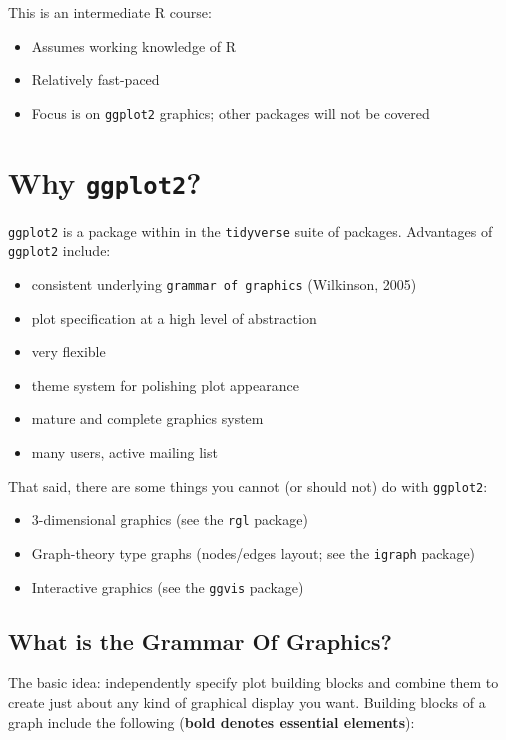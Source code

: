\documentclass[]{book}
\providecommand{\tightlist}{%
  \setlength{\itemsep}{0pt}\setlength{\parskip}{0pt}}
\begin{document}
This is an intermediate R course:

\begin{itemize}
\tightlist
\item
  Assumes working knowledge of R
\item
  Relatively fast-paced
\item
  Focus is on \texttt{ggplot2} graphics; other packages will not be
  covered
\end{itemize}

\section{\texorpdfstring{Why
\texttt{ggplot2}?}{Why ggplot2?}}\label{why-ggplot2}

\texttt{ggplot2} is a package within in the \texttt{tidyverse} suite of
packages. Advantages of \texttt{ggplot2} include:

\begin{itemize}
\tightlist
\item
  consistent underlying \texttt{grammar\ of\ graphics} (Wilkinson, 2005)
\item
  plot specification at a high level of abstraction
\item
  very flexible
\item
  theme system for polishing plot appearance
\item
  mature and complete graphics system
\item
  many users, active mailing list
\end{itemize}

That said, there are some things you cannot (or should not) do with
\texttt{ggplot2}:

\begin{itemize}
\tightlist
\item
  3-dimensional graphics (see the \texttt{rgl} package)
\item
  Graph-theory type graphs (nodes/edges layout; see the \texttt{igraph}
  package)
\item
  Interactive graphics (see the \texttt{ggvis} package)
\end{itemize}

\subsection{What is the Grammar Of
Graphics?}\label{what-is-the-grammar-of-graphics}

The basic idea: independently specify plot building blocks and combine
them to create just about any kind of graphical display you want.
Building blocks of a graph include the following (\textbf{bold denotes
essential elements}):
\end{document}

